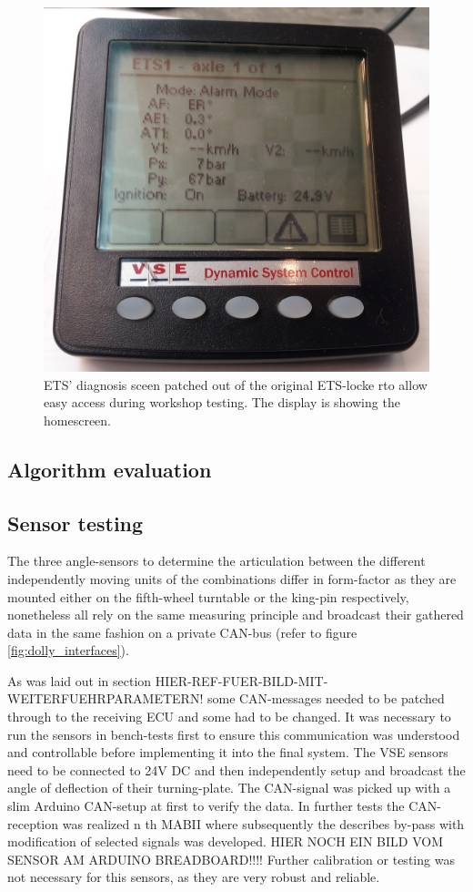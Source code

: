 \documentclass[ExampleMasters.tex]{subfiles}
\begin{document}
\begin{figure}[h]
\centering
\includegraphics[width=0.6\linewidth]{figures/ETS_display_homescreen}
\caption{\gls{ETS}' diagnosis sceen patched out of the original ETS-locke rto allow easy access during workshop testing. The display is showing the homescreen.}
\label{fig:ETS_display_homescreen}
\end{figure}

\subsection{Algorithm evaluation}
\subsection{Sensor testing}

The three angle-sensors to determine the articulation between the different independently moving units of the combinations differ in form-factor as they are mounted either on the fifth-wheel turntable or the king-pin respectively, nonetheless all rely on the same measuring principle and broadcast their gathered data in the same fashion on a private \gls{CAN}-bus (refer to figure \ref{fig:dolly_interfaces}). 

As was laid out in section HIER-REF-FUER-BILD-MIT-WEITERFUEHRPARAMETERN! some CAN-messages needed to be patched through to the receiving \gls{ECU} and some had to be changed. It was necessary to run the sensors in bench-tests first to ensure this communication was understood and controllable before implementing it into the final system. The \gls{VSE} sensors need to be connected to 24V \gls{DC} and then independently setup and broadcast the angle of deflection of their turning-plate. The CAN-signal was picked up with a slim Arduino CAN-setup at first to verify the data. In further tests the \gls{CAN}-reception was realized n th \gls{MABII} where subsequently the describes by-pass with modification of selected signals was developed. HIER NOCH EIN BILD VOM SENSOR AM ARDUINO BREADBOARD!!!! Further calibration or testing was not necessary for this sensors, as they are very robust and reliable. 
\end{document}
